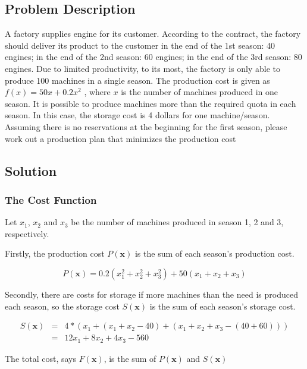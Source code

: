 \documentclass[12pt]{article}
\begin{document}
\subsection{Problem Description}

A factory supplies engine for its customer. According to the contract, the
factory should deliver its product to the customer in the end of the 1st season: 40 engines;
in the end of the 2nd season: 60 engines; in the end of the 3rd season: 80 engines. Due
to limited productivity, to its most, the factory is only able to produce 100 machines
in a single season. The production cost is given as $f(x) = 50x + 0.2x^2$
, where $x$ is the
number of machines produced in one season. It is possible to produce machines more
than the required quota in each season. In this case, the storage cost is 4 dollars for one
machine/season. Assuming there is no reservations at the beginning for the first season,
please work out a production plan that minimizes the production cost

\subsection{Solution}

\subsubsection{The Cost Function}

Let $x_1$, $x_2$ and $x_3$ be the number of machines produced in season 1, 2 and 3, respectively.

Firstly, the production cost $P(\mathbf{x})$ is the sum of each season's production cost.

\begin{equation}
	P(\mathbf{x})=0.2(x_1^2+x_2^2+x_3^2)+50(x_1+x_2+x_3)
\end{equation}

Secondly, there are costs for storage if more machines than the need is produced each season, so the storage cost  $S(\mathbf{x})$ is the sum of each season's storage cost.

\begin{equation}
	\begin{aligned}
		S(\mathbf{x}) &=& 4*(x_1+(x_1+x_2-40)+(x_1+x_2+x_3-(40+60))) \\
		&=& 12x_1+8x_2+4x_3-560
	\end{aligned}
\end{equation}

The total cost, says $F(\mathbf{x})$, is the sum of $P(\mathbf{x})$ and $S(\mathbf{x})$ 
\end{document}

